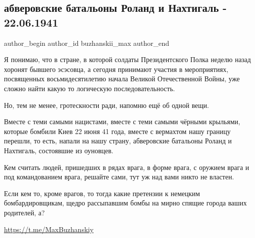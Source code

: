  
 
 
 
 
 
\subsection{абверовские батальоны Роланд и Нахтигаль - 22.06.1941}
\label{sec:22_06_2021.fb.buzhanskii_max.2.nacizm_napadenie_22_06_1941_oun}
\ifcmt
 author_begin
   author_id buzhanskii_max
 author_end
\fi

Я понимаю, что в стране, в которой солдаты Президентского Полка неделю назад
хоронят бывшего эсэсовца, а сегодня принимают участия в мероприятиях,
посвященных восьмидесятилетию начала Великой Отечественной Войны, уже сложно
найти какую то логическую последовательность.

Но, тем не менее, гротескности ради, напомню ещё об одной вещи.

Вместе с теми самыми нацистами, вместе с теми самыми чёрными крыльями, которые
бомбили Киев 22 июня 41 года, вместе с вермахтом нашу границу перешли, то есть,
напали на нашу страну, абверовские батальоны Роланд и Нахтигаль, состоявшие из
оуновцев.

Кем считать людей, пришедших в рядах врага, в форме врага, с оружием врага и
под командованием врага, решайте сами, тут уж над вами никто не властен.

Если кем то, кроме врагов, то тогда какие претензии к немецким
бомбардировщикам, щедро рассыпавшим бомбы на мирно спящие города ваших
родителей, а?

\url{https://t.me/MaxBuzhanskiy}


